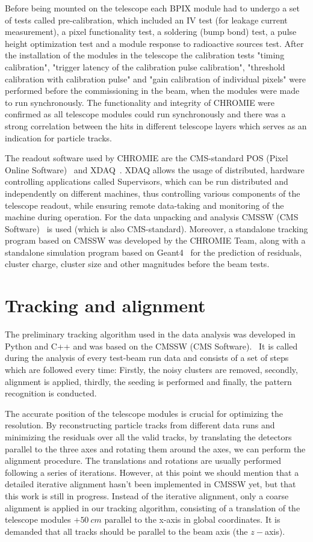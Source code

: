 \documentclass[a4paper,11pt]{article}
\begin{document}
Before being mounted on the telescope each BPIX module had to undergo a set of tests called pre-calibration, which included an IV test (for leakage current measurement), a pixel functionality test, a soldering (bump bond) test, a pulse height optimization test and a module response to radioactive sources test. After the installation of the modules in the telescope the calibration tests "timing calibration", "trigger latency of the calibration pulse calibration", "threshold calibration with calibration pulse" and "gain calibration of individual pixels" were performed before the commissioning in the beam, when the modules were made to run synchronously. The functionality and integrity of CHROMIE were confirmed as all telescope modules could run synchronously and there was a strong correlation between the hits in different telescope layers which serves as an indication for particle tracks.

The readout software used by CHROMIE are the CMS-standard POS (Pixel Online Software)~\cite{g} and XDAQ~\cite{h}. XDAQ allows the usage of distributed, hardware controlling applications called Supervisors, which can be run distributed and independently on different machines, thus controlling various components of the telescope readout, while ensuring remote data-taking and monitoring of the machine during operation. For the data unpacking and analysis CMSSW (CMS Software)~\cite{i} is used (which is also CMS-standard). Moreover, a standalone tracking program based on CMSSW was developed by the CHROMIE Team, along with a standalone simulation program based on Geant4~\cite{j} for the prediction of residuals, cluster charge, cluster size and other magnitudes before the beam tests.

\section{Tracking and alignment}
The preliminary tracking algorithm used in the data analysis was developed in Python and C++ and was based on the CMSSW (CMS Software).~\cite{i} It is called during the analysis of every test-beam run data and consists of a set of steps which are followed every time: Firstly, the noisy clusters are removed, secondly, alignment is applied, thirdly, the seeding is performed and finally, the pattern recognition is conducted. 

The accurate position of the telescope modules is crucial for optimizing the resolution. By reconstructing particle tracks from different data runs and minimizing the residuals over all the valid tracks, by translating the detectors parallel to the three axes and rotating them around the axes, we can perform the alignment procedure. The translations and rotations are usually performed following a series of iterations. However, at this point we should mention that a detailed iterative alignment hasn’t been implemented in CMSSW yet, but that this work is still in progress. Instead of the iterative alignment, only a coarse alignment is applied in our tracking algorithm, consisting of a translation of the telescope modules $+50\: cm$ parallel to the x-axis in global coordinates. It is demanded that all tracks should be parallel to the beam axis (the $z-$axis).
\end{document}
